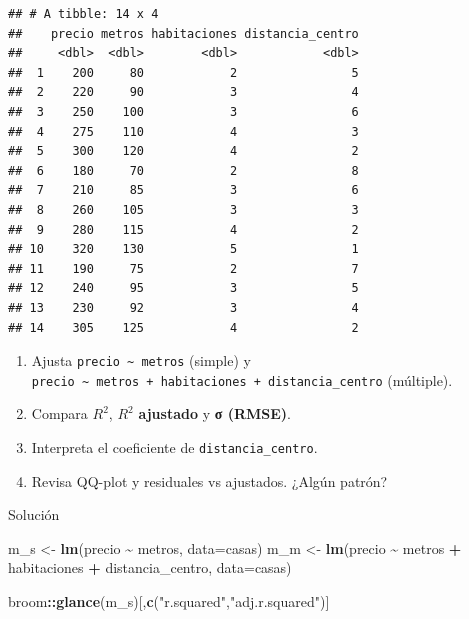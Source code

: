 \documentclass[
]{book}
\newenvironment{Shaded}{\begin{snugshade}}{\end{snugshade}}
\newcommand{\AttributeTok}[1]{\textcolor[rgb]{0.13,0.29,0.53}{#1}}
\newcommand{\FunctionTok}[1]{\textcolor[rgb]{0.13,0.29,0.53}{\textbf{#1}}}
\newcommand{\NormalTok}[1]{#1}
\newcommand{\OtherTok}[1]{\textcolor[rgb]{0.56,0.35,0.01}{#1}}
\newcommand{\SpecialCharTok}[1]{\textcolor[rgb]{0.81,0.36,0.00}{\textbf{#1}}}
\newcommand{\StringTok}[1]{\textcolor[rgb]{0.31,0.60,0.02}{#1}}
\providecommand{\tightlist}{%
  \setlength{\itemsep}{0pt}\setlength{\parskip}{0pt}}
\begin{document}
\begin{verbatim}
## # A tibble: 14 x 4
##    precio metros habitaciones distancia_centro
##     <dbl>  <dbl>        <dbl>            <dbl>
##  1    200     80            2                5
##  2    220     90            3                4
##  3    250    100            3                6
##  4    275    110            4                3
##  5    300    120            4                2
##  6    180     70            2                8
##  7    210     85            3                6
##  8    260    105            3                3
##  9    280    115            4                2
## 10    320    130            5                1
## 11    190     75            2                7
## 12    240     95            3                5
## 13    230     92            3                4
## 14    305    125            4                2
\end{verbatim}

\begin{enumerate}
\def\labelenumi{\arabic{enumi})}
\tightlist
\item
  Ajusta \texttt{precio\ \textasciitilde{}\ metros} (simple) y \texttt{precio\ \textasciitilde{}\ metros\ +\ habitaciones\ +\ distancia\_centro} (múltiple).\\
\item
  Compara \(R^2\), \(R^2\) \textbf{ajustado} y \textbf{σ (RMSE)}.\\
\item
  Interpreta el coeficiente de \texttt{distancia\_centro}.\\
\item
  Revisa QQ-plot y residuales vs ajustados. ¿Algún patrón?
\end{enumerate}

Solución

\begin{Shaded}
\begin{Highlighting}[]
\NormalTok{m\_s }\OtherTok{\textless{}{-}} \FunctionTok{lm}\NormalTok{(precio }\SpecialCharTok{\textasciitilde{}}\NormalTok{ metros, }\AttributeTok{data=}\NormalTok{casas)}
\NormalTok{m\_m }\OtherTok{\textless{}{-}} \FunctionTok{lm}\NormalTok{(precio }\SpecialCharTok{\textasciitilde{}}\NormalTok{ metros }\SpecialCharTok{+}\NormalTok{ habitaciones }\SpecialCharTok{+}\NormalTok{ distancia\_centro, }\AttributeTok{data=}\NormalTok{casas)}

\NormalTok{broom}\SpecialCharTok{::}\FunctionTok{glance}\NormalTok{(m\_s)[,}\FunctionTok{c}\NormalTok{(}\StringTok{"r.squared"}\NormalTok{,}\StringTok{"adj.r.squared"}\NormalTok{)]}
\end{Highlighting}
\end{Shaded}
\end{document}
